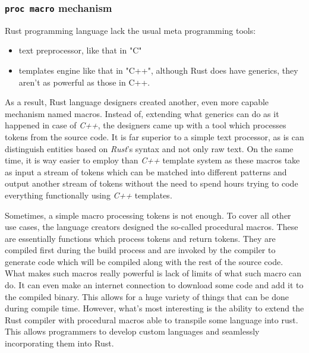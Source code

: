 \subsubsection{\texttt{proc macro} mechanism}
Rust programming language lack the usual meta programming tools:
\begin{itemize}
    \item text preprocessor, like that in "C"
    \item templates engine like that in "C++", although Rust does have generics, they aren't as powerful as those in C++.
\end{itemize}
As a result, Rust language designers created another, even more capable mechanism named macros. Instead of, extending what generics can do as it happened in case of \textit{C++}, the designers came up with a tool which processes tokens from the source code. It is far superior to a simple text processor, as is can distinguish entities based on \textit{Rust}'s syntax and not only raw text. On the same time, it is way easier to employ than \textit{C++} template system as these macros take as input a stream of tokens which can be matched into different patterns and output another stream of tokens without the need to spend hours trying to code everything functionally using \textit{C++} templates. 

Sometimes, a simple macro processing tokens is not enough. To cover all other use cases, the language creators designed the so-called procedural macros. These are essentially functions which process tokens and return tokens. They are compiled first during the build process and are invoked by the compiler to generate code which will be compiled along with the rest of the source code. What makes such macros really powerful is lack of limits of what such macro can do. It can even make an internet connection to download some code and add it to the compiled binary. This allows for a huge variety of things that can be done during compile time. 
However, what's most interesting is the ability to extend the Rust compiler with procedural macros able to transpile some language into rust. This allows programmers to develop custom languages and seamlessly incorporating them into Rust.


